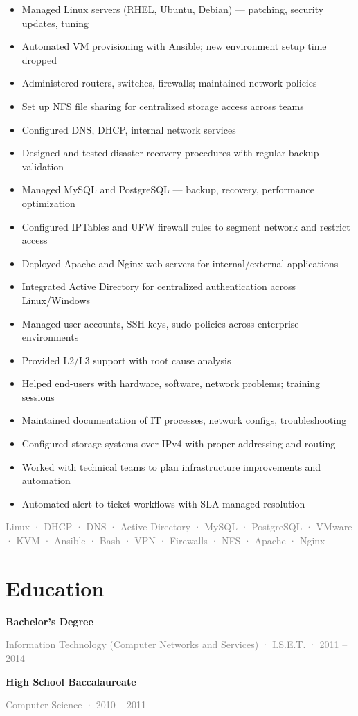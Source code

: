 \documentclass[10pt,a4paper]{article}
\newcommand{\tagline}[1]{\textcolor{graytext}{\small #1}\par}
\begin{document}
\begin{itemize}
  \item Managed Linux servers (RHEL, Ubuntu, Debian) — patching, security updates, tuning
  \item Automated VM provisioning with Ansible; new environment setup time dropped
  \item Administered routers, switches, firewalls; maintained network policies
  \item Set up NFS file sharing for centralized storage access across teams
  \item Configured DNS, DHCP, internal network services
  \item Designed and tested disaster recovery procedures with regular backup validation
  \item Managed MySQL and PostgreSQL — backup, recovery, performance optimization
  \item Configured IPTables and UFW firewall rules to segment network and restrict access
  \item Deployed Apache and Nginx web servers for internal/external applications
  \item Integrated Active Directory for centralized authentication across Linux/Windows
  \item Managed user accounts, SSH keys, sudo policies across enterprise environments
  \item Provided L2/L3 support with root cause analysis
  \item Helped end-users with hardware, software, network problems; training sessions
  \item Maintained documentation of IT processes, network configs, troubleshooting
  \item Configured storage systems over IPv4 with proper addressing and routing
  \item Worked with technical teams to plan infrastructure improvements and automation
  \item Automated alert-to-ticket workflows with SLA-managed resolution
\end{itemize}
\tagline{Linux · DHCP · DNS · Active Directory · MySQL · PostgreSQL · VMware · KVM · Ansible · Bash · VPN · Firewalls · NFS · Apache · Nginx}
\vspace{1pt}
\section*{Education}
\textbf{Bachelor's Degree}\par
\tagline{Information Technology (Computer Networks and Services) · I.S.E.T. · 2011 – 2014}
\textbf{High School Baccalaureate}\par
\tagline{Computer Science · 2010 – 2011}
\end{document}

